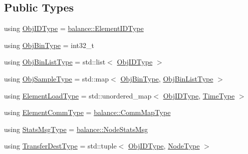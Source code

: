 \subsection*{Public Types}
\begin{DoxyCompactItemize}
\item 
using \hyperlink{structvt_1_1vrt_1_1collection_1_1lb_1_1_base_l_b_a15a2f756b59c8c2437985206b32aa403}{Obj\+I\+D\+Type} = \hyperlink{namespacevt_1_1vrt_1_1collection_1_1balance_a14c8d2c972f2913aa3f1636e5be0a120}{balance\+::\+Element\+I\+D\+Type}
\item 
using \hyperlink{structvt_1_1vrt_1_1collection_1_1lb_1_1_base_l_b_ae0bff8fcf0dec0abc1d81836cf1d060a}{Obj\+Bin\+Type} = int32\+\_\+t
\item 
using \hyperlink{structvt_1_1vrt_1_1collection_1_1lb_1_1_base_l_b_ab29c64ca66a928f34cf638dad6163f80}{Obj\+Bin\+List\+Type} = std\+::list$<$ \hyperlink{structvt_1_1vrt_1_1collection_1_1lb_1_1_base_l_b_a15a2f756b59c8c2437985206b32aa403}{Obj\+I\+D\+Type} $>$
\item 
using \hyperlink{structvt_1_1vrt_1_1collection_1_1lb_1_1_base_l_b_a331d7da5bbf2883238427d86b54ddd7b}{Obj\+Sample\+Type} = std\+::map$<$ \hyperlink{structvt_1_1vrt_1_1collection_1_1lb_1_1_base_l_b_ae0bff8fcf0dec0abc1d81836cf1d060a}{Obj\+Bin\+Type}, \hyperlink{structvt_1_1vrt_1_1collection_1_1lb_1_1_base_l_b_ab29c64ca66a928f34cf638dad6163f80}{Obj\+Bin\+List\+Type} $>$
\item 
using \hyperlink{structvt_1_1vrt_1_1collection_1_1lb_1_1_base_l_b_aa286d31a0820a8fc9218ccb858368fca}{Element\+Load\+Type} = std\+::unordered\+\_\+map$<$ \hyperlink{structvt_1_1vrt_1_1collection_1_1lb_1_1_base_l_b_a15a2f756b59c8c2437985206b32aa403}{Obj\+I\+D\+Type}, \hyperlink{namespacevt_a876a9d0cd5a952859c72de8a46881442}{Time\+Type} $>$
\item 
using \hyperlink{structvt_1_1vrt_1_1collection_1_1lb_1_1_base_l_b_ac3f8560bfe41aa593eb7d5bd1241cc4c}{Element\+Comm\+Type} = \hyperlink{namespacevt_1_1vrt_1_1collection_1_1balance_a10860c956804d644db54a16012352728}{balance\+::\+Comm\+Map\+Type}
\item 
using \hyperlink{structvt_1_1vrt_1_1collection_1_1lb_1_1_base_l_b_a0cddaecd9e8450190585d0607a3439f1}{Stats\+Msg\+Type} = \hyperlink{structvt_1_1vrt_1_1collection_1_1balance_1_1_node_stats_msg}{balance\+::\+Node\+Stats\+Msg}
\item 
using \hyperlink{structvt_1_1vrt_1_1collection_1_1lb_1_1_base_l_b_add886785f64ea725005f1263fd1393be}{Transfer\+Dest\+Type} = std\+::tuple$<$ \hyperlink{structvt_1_1vrt_1_1collection_1_1lb_1_1_base_l_b_a15a2f756b59c8c2437985206b32aa403}{Obj\+I\+D\+Type}, \hyperlink{namespacevt_a866da9d0efc19c0a1ce79e9e492f47e2}{Node\+Type} $>$

\end{DoxyCompactItemize}
